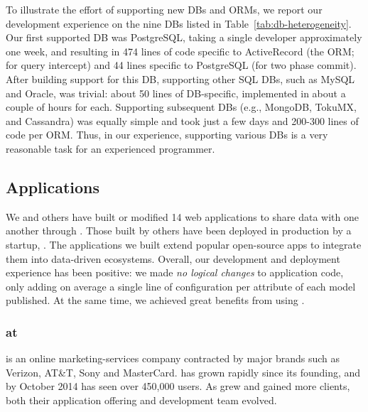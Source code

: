 To illustrate the effort of supporting new DBs and ORMs, we report our development experience on the nine DBs listed in Table~\ref{tab:db-heterogeneity}.
Our first supported DB was PostgreSQL, taking a single developer approximately one week, and resulting in 474 lines of code specific to ActiveRecord (the ORM; for query intercept) and 44 lines specific to PostgreSQL (for two phase commit). 
After building support for this DB, supporting other SQL DBs, such as MySQL and Oracle, was trivial: about 50 lines of DB-specific, implemented in about a couple of hours for each.
Supporting subsequent DBs (e.g., MongoDB, TokuMX, and Cassandra) was equally simple and took just a few days and 200-300 lines of code per ORM.
Thus, in our experience, supporting various DBs is a very reasonable task for an experienced programmer.
\subsection{Applications}
\label{sec:apps}

We and others have built or modified 14 web applications to share data with
one another through \synapse.  Those built by others have been
deployed in production by a startup, \crowdtap.  The applications we built
extend popular open-source apps to integrate them into data-driven ecosystems. 
Overall, our development and deployment experience has been positive: we made
{\em no logical changes} to application code, only adding on
average a single line of configuration per attribute of each model published.
At the same time, we achieved great benefits from using \synapse.  

\subsubsection{\synapse at \crowdtap}
\label{sec:apps:crowdtap}

\crowdtap is an online marketing-services company contracted by major brands such as Verizon, AT\&T, Sony and MasterCard.
\crowdtap has grown rapidly since its founding, and by October 2014 has seen over 450,000 users.
As \crowdtap grew and gained more clients, both their application offering and development team evolved.

